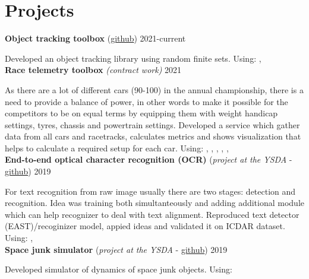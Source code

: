 \section*{\sectionformat Projects}
\textbf{Object tracking toolbox} (\href{https://github.com/neer201/Multi-Object-Tracking-for-Automotive-Systems-in-python}{github}) \hfill 2021-current
\par
Developed an object tracking library using random finite sets.
Using: , 
\\
% 
\textbf{Race telemetry toolbox} \textit{(contract work)} \hfill 2021
\par
As there are a lot of different cars (90-100) in the annual championship, there is a need to provide a balance of power, in other words to make it possible for the competitors to be on equal terms by equipping them with weight handicap settings, tyres, chassis and powertrain settings.
Developed a service which gather data from all cars and racetracks, calculates metrics and shows visualization that helps to calculate a required setup for each car.
Using: , , , , , 
\\
\textbf{End-to-end optical character recognition (OCR)} (\textit{project at the YSDA} - \href{https://github.com/neer201/end2end_OCR}{github})  \hfill 2019
\par
For text recognition from raw image usually there are two stages: detection and recognition. Idea was training both simultanteously and adding additional module which can help recognizer to deal with text alignment.
Reproduced text detector (EAST)/recoginizer model, appied ideas and validated it on ICDAR dataset.
Using: , 
% 
\\
\textbf{Space junk simulator} (\textit{project at the YSDA} - \href{https://github.com/neer201/space_junk_simulator}{github})   \hfill 2019
\par
Developed simulator of dynamics of space junk objects.
Using: 
